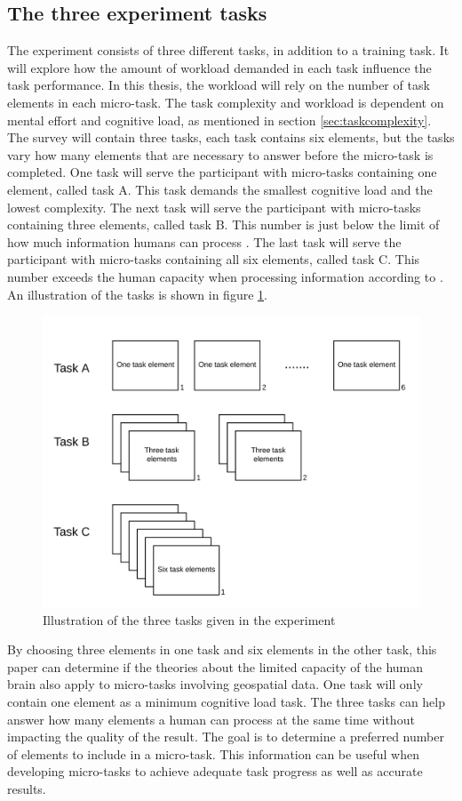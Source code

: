 \subsection{The three experiment tasks}\label{sec:experimenttasks}
The experiment consists of three different tasks, in addition to a training task. It will explore how the amount of workload demanded in each task influence the task performance. In this thesis, the workload will rely on the number of task elements in each micro-task. The task complexity and workload is dependent on mental effort and cognitive load, as mentioned in section \ref{sec:taskcomplexity}. The survey will contain three tasks, each task contains six elements, but the tasks vary how many elements that are necessary to answer before the micro-task is completed. One task will serve the participant with micro-tasks containing one element, called task A. This task demands the smallest cognitive load and the lowest complexity. The next task will serve the participant with micro-tasks containing three elements, called task B. This number is just below the limit of how much information humans can process \citep{Mandler2013}. The last task will serve the participant with micro-tasks containing all six elements, called task C. This number exceeds the human capacity when processing information according to \cite{Leppink2014a}. An illustration of the tasks is shown in figure \ref{fig:illustrationmicrotasks}.

\begin{figure}[H]
	\centering
	\includegraphics[width=0.7\linewidth]{fig/illustration_microtasks}
	\caption{Illustration of the three tasks given in the experiment}
	\label{fig:illustrationmicrotasks}
\end{figure}

By choosing three elements in one task and six elements in the other task, this paper can determine if the theories about the limited capacity of the human brain also apply to micro-tasks involving geospatial data. One task will only contain one element as a minimum cognitive load task. The three tasks can help answer how many elements a human can process at the same time without impacting the quality of the result. The goal is to determine a preferred number of elements to include in a micro-task. This information can be useful when developing micro-tasks to achieve adequate task progress as well as accurate results.

